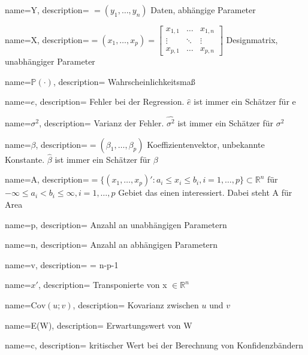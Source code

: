 
{
    name=Y,
    description={ $=(y_1, \ldots, y_n)$ Daten, abhängige Parameter}
}
 
{
    name=X,
    description={$=(x_1, \ldots, x_p)=\begin{bmatrix} x_{1,1} & \ldots & x_{1,n} \\ \vdots & \ddots & \vdots \\ x_{p,1} & \ldots & x_{p,n} \end{bmatrix}$ Designmatrix, unabhängiger Parameter}
}

{
    name=$\mathbb{P}(\cdot)$,
    description={ Wahrscheinlichkeitsmaß }
} 

{
    name=$e$,
    description={ Fehler bei der Regression. $\hat{e}$ ist immer ein Schätzer für e }
} 
 

{
    name=$\sigma^2$,
    description={ Varianz der Fehler. $\widehat{\sigma^2}$ ist immer ein Schätzer für $\sigma^2$ }
} 

{
    name=$\beta$,
    description={$=(\beta_1, \ldots, \beta_p)$ Koeffizientenvektor, unbekannte Konstante. $\hat{\beta}$ ist immer ein Schätzer für $\beta$}
} 

{
    name=A,
    description={$= \{(x_1, \ldots, x_p)' : a_i \leq x_i \leq b_i, i = 1, \ldots, p \} \subset \mathbb{R}^n$ für $- \infty \leq a_i < b_i \leq \infty, i=1, \ldots, p$ Gebiet das einen interessiert. Dabei steht A für Area}
} 
 

{
    name=p,
    description={ Anzahl an unabhängigen Parametern}
} 

{
    name=n,
    description={ Anzahl an abhängigen Parametern}
} 

{
    name=v,
    description={ = n-p-1}
} 

{
    name=$x'$,
    description={ Transponierte von x $\in \mathbb{R}^n$}
} 

{
    name=$\text{Cov}(u;v)$,
    description={ Kovarianz zwischen $u$ und $v$}
} 

{
    name=E(W),
    description={ Erwartungswert von W}
}  
 
{
    name=c,
    description={ kritischer Wert bei der Berechnung von Konfidenzbändern}
} 

